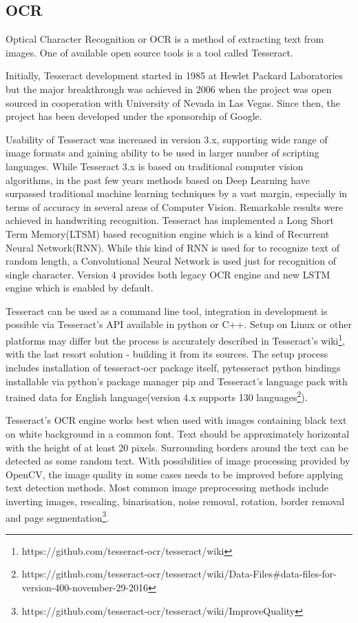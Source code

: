 \subsection{OCR}
Optical Character Recognition or OCR is a method of extracting text from images. One of available open source tools is a tool called Tesseract.

Initially, Tesseract development started in 1985 at Hewlet Packard Laboratories but the major breakthrough was achieved in 2006 when the project was open sourced in cooperation with University of Nevada in Las Vegas. Since then, the project has been developed under the sponsorship of Google\cite{tesseract_history}.

Usability of Tesseract was increased in version 3.x, supporting wide range of image formats and gaining ability to be used in larger number of scripting languages. While Tesseract 3.x is based on traditional computer vision algorithms, in the past few years methods based on Deep Learning have surpassed traditional machine learning techniques by a vast margin, especially in terms of accuracy in several areas of Computer Vision. Remarkable results were achieved in handwriting recognition. Tesseract has implemented a Long Short Term Memory(LTSM) based recognition engine which is a kind of Recurrent Neural Network(RNN). While this kind of RNN is used for to recognize text of random length, a Convolutional Neural Network is used just for recognition of single character. Version 4 provides both legacy OCR engine and new LSTM engine which is enabled by default.\cite{tesseract}

Tesseract can be used as a command line tool, integration in development is possible via Tesseract's API available in python or C++. Setup on Linux or other platforms may differ but the process is accurately described in Tesseract's wiki\footnote{https://github.com/tesseract-ocr/tesseract/wiki}, with the last resort solution - building it from its sources.
The setup process includes installation of tesseract-ocr package itself, pytesseract python bindings installable via python's package manager pip and Tesseract's language pack with trained data for English language(version 4.x supports 130 languages\footnote{https://github.com/tesseract-ocr/tesseract/wiki/Data-Files#data-files-for-version-400-november-29-2016}). 

Tesseract's OCR engine works best when used with images containing black text on white background in a common font. Text should be approximately horizontal with the height of at least 20 pixels. Surrounding borders around the text can be detected as some random text. With possibilities of image processing provided by OpenCV, the image quality in some cases needs to be improved before applying text detection methods. Most common image preprocessing methods include inverting images, rescaling, binarisation, noise removal, rotation, border removal and page segmentation\footnote{https://github.com/tesseract-ocr/tesseract/wiki/ImproveQuality}.

